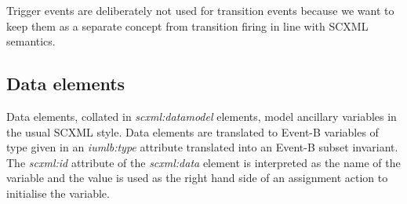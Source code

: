 Trigger events are deliberately not used for transition events because we 
want to keep them as a separate concept from transition firing in line 
with SCXML semantics.

\subsection{Data elements}
Data elements, collated in \emph{scxml:datamodel} elements, model ancillary 
variables in the usual SCXML style. Data elements are translated to 
Event-B variables of type given in an \emph{iumlb:type} attribute translated 
into an Event-B subset invariant.  The \emph{scxml:id} attribute of the 
\emph{scxml:data} element is interpreted as the name of the variable and 
the value is used as the right hand side of an assignment action to initialise 
the variable.  


